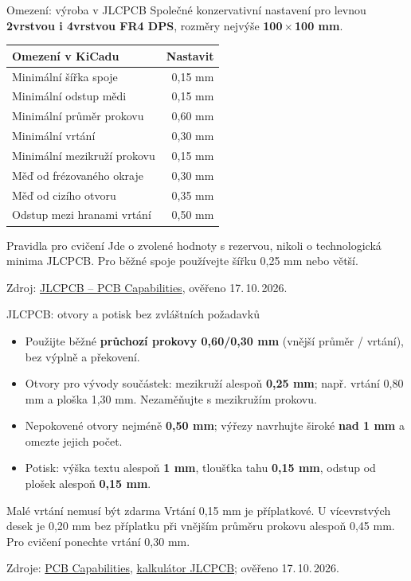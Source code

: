 \documentclass{beamer}
\begin{document}
\begin{frame}{Omezení: výroba v JLCPCB}
	\small
	Společné konzervativní nastavení pro levnou \textbf{2vrstvou i 4vrstvou FR4 DPS}, rozměry nejvýše \textbf{100\,$\times$\,100 mm}.
	\begin{center}
		\begin{tabular}{lr}
			\textbf{Omezení v KiCadu} & \textbf{Nastavit} \\
			\hline
			Minimální šířka spoje & 0,15 mm \\
			Minimální odstup mědi & 0,15 mm \\
			Minimální průměr prokovu & 0,60 mm \\
			Minimální vrtání & 0,30 mm \\
			Minimální mezikruží prokovu & 0,15 mm \\
			Měď od frézovaného okraje & 0,30 mm \\
			Měď od cizího otvoru & 0,35 mm \\
			Odstup mezi hranami vrtání & 0,50 mm \\
		\end{tabular}
	\end{center}
	\begin{block}{Pravidla pro cvičení}
	Jde o zvolené hodnoty s rezervou, nikoli o technologická minima JLCPCB. Pro běžné spoje používejte šířku 0,25 mm nebo větší.
	\end{block}
	\vfill
	{\tiny Zdroj: \href{https://jlcpcb.com/capabilities/pcb-capabilities}{JLCPCB -- PCB Capabilities}, ověřeno 17.\,10.\,2026.}
\end{frame}

\begin{frame}{JLCPCB: otvory a potisk bez zvláštních požadavků}
	\small
	\begin{itemize}
		\item Použijte běžné \textbf{průchozí prokovy 0,60/0,30 mm} (vnější průměr / vrtání), bez výplně a překovení.
		\item Otvory pro vývody součástek: mezikruží alespoň \textbf{0,25 mm}; např. vrtání 0,80 mm a ploška 1,30 mm. Nezaměňujte s mezikružím prokovu.
		\item Nepokovené otvory nejméně \textbf{0,50 mm}; výřezy navrhujte široké \textbf{nad 1 mm} a omezte jejich počet.
		\item Potisk: výška textu alespoň \textbf{1 mm}, tloušťka tahu \textbf{0,15 mm}, odstup od plošek alespoň \textbf{0,15 mm}.
	\end{itemize}
	\begin{block}{Malé vrtání nemusí být zdarma}
	Vrtání 0,15 mm je příplatkové. U vícevrstvých desek je 0,20 mm bez příplatku při vnějším průměru prokovu alespoň 0,45 mm. Pro cvičení ponechte vrtání 0,30 mm.
	\end{block}
	\vfill
	{\tiny Zdroje: \href{https://jlcpcb.com/capabilities/pcb-capabilities}{PCB Capabilities}, \href{https://cart.jlcpcb.com/quote}{kalkulátor JLCPCB}; ověřeno 17.\,10.\,2026.}
\end{frame}
\end{document}
